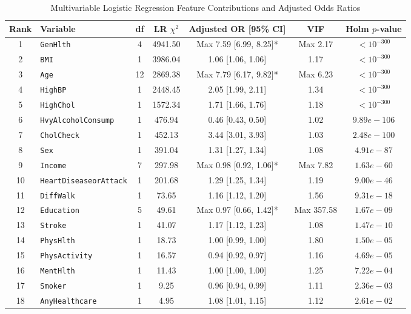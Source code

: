 \begin{table}[htbp]
\centering
\caption{Multivariable Logistic Regression Feature Contributions and Adjusted Odds Ratios}
\label{tab:multivariable}
\footnotesize
\setlength{\tabcolsep}{2.5pt}
\begin{tabular}{@{}clccccc@{}}
\toprule
\textbf{Rank} & \textbf{Variable} & \textbf{df} & \textbf{LR $\chi^2$} & \textbf{Adjusted OR [95\% CI]} & \textbf{VIF} & \textbf{Holm $p$-value} \\
\midrule
1 & \texttt{GenHlth} & 4 & 4941.50 & Max 7.59 [6.99, 8.25]* & Max 2.17 & $< 10^{-300}$ \\
2 & \texttt{BMI} & 1 & 3986.04 & 1.06 [1.06, 1.06] & 1.17 & $< 10^{-300}$ \\
3 & \texttt{Age} & 12 & 2869.38 & Max 7.79 [6.17, 9.82]* & Max 6.23 & $< 10^{-300}$ \\
4 & \texttt{HighBP} & 1 & 2448.45 & 2.05 [1.99, 2.11] & 1.34 & $< 10^{-300}$ \\
5 & \texttt{HighChol} & 1 & 1572.34 & 1.71 [1.66, 1.76] & 1.18 & $< 10^{-300}$ \\
6 & \texttt{HvyAlcoholConsump} & 1 & 476.94 & 0.46 [0.43, 0.50] & 1.02 & $9.89e-106$ \\
7 & \texttt{CholCheck} & 1 & 452.13 & 3.44 [3.01, 3.93] & 1.03 & $2.48e-100$ \\
8 & \texttt{Sex} & 1 & 391.04 & 1.31 [1.27, 1.34] & 1.08 & $4.91e-87$ \\
9 & \texttt{Income} & 7 & 297.98 & Max 0.98 [0.92, 1.06]* & Max 7.82 & $1.63e-60$ \\
10 & \texttt{HeartDiseaseorAttack} & 1 & 201.68 & 1.29 [1.25, 1.34] & 1.19 & $9.00e-46$ \\
11 & \texttt{DiffWalk} & 1 & 73.65 & 1.16 [1.12, 1.20] & 1.56 & $9.31e-18$ \\
12 & \texttt{Education} & 5 & 49.61 & Max 0.97 [0.66, 1.42]* & Max 357.58 & $1.67e-09$ \\
13 & \texttt{Stroke} & 1 & 41.07 & 1.17 [1.12, 1.23] & 1.08 & $1.47e-10$ \\
14 & \texttt{PhysHlth} & 1 & 18.73 & 1.00 [0.99, 1.00] & 1.80 & $1.50e-05$ \\
15 & \texttt{PhysActivity} & 1 & 16.57 & 0.94 [0.92, 0.97] & 1.16 & $4.69e-05$ \\
16 & \texttt{MentHlth} & 1 & 11.43 & 1.00 [1.00, 1.00] & 1.25 & $7.22e-04$ \\
17 & \texttt{Smoker} & 1 & 9.25 & 0.96 [0.94, 0.99] & 1.11 & $2.36e-03$ \\
18 & \texttt{AnyHealthcare} & 1 & 4.95 & 1.08 [1.01, 1.15] & 1.12 & $2.61e-02$ \\

\end{tabular}
\end{table}
